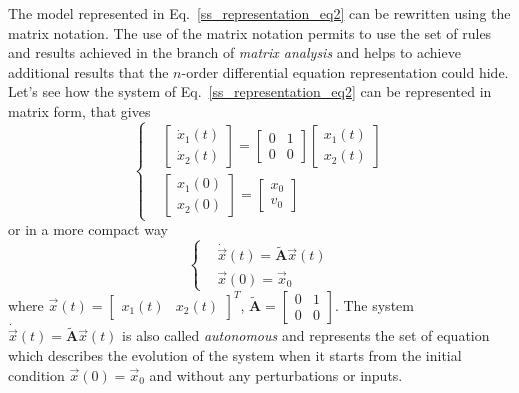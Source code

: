 \documentclass[12pt,a4paper,oneside]{book}
\begin{document}
\begin{onehalfspace}
The model represented in Eq.~\eqref{ss_representation_eq2} can be rewritten 
using the matrix notation. The use of the matrix notation permits to use the 
set of rules and results achieved in the branch of \textit{matrix analysis} 
and helps to achieve additional results that the $n$-order differential 
equation representation could hide. Let's see how the system of 
Eq.~\eqref{ss_representation_eq2} can be represented in matrix form, that gives
\begin{equation}\label{ss_representation_eq3}
	\left\lbrace \begin{aligned}
		&\begin{bmatrix} \dot{x}_1(t)\\ \dot{x}_2(t) \end{bmatrix} = \begin{bmatrix} 0&1\\0&0 \end{bmatrix} \begin{bmatrix} {x}_1(t)\\ {x}_2(t) \end{bmatrix} \\[6pt]
		&\begin{bmatrix} {x}_1(0)\\ {x}_2(0) \end{bmatrix} = \begin{bmatrix} x_0 \\ v_0 \end{bmatrix}
	\end{aligned}\right. 
\end{equation}
or in a more compact way
\begin{equation}\label{ss_representation_eq4}
	\left\lbrace \begin{aligned}
		&\dot{\vec{x}}(t)=\tilde{\mathbf{A}}\vec{x}(t) \\[6pt]
		&\vec{x}(0) = \vec{x}_0
	\end{aligned}\right. 
\end{equation}
where $\vec{x}(t)=\begin{bmatrix} x_1(t)&x_2(t) \end{bmatrix}^T$, $\tilde{\mathbf{A}}=\begin{bmatrix} 0&1\\0&0 \end{bmatrix}$.
The system $\dot{\vec{x}}(t)=\tilde{\mathbf{A}}\vec{x}(t)$ is also called 
\textit{autonomous} and represents the set of equation which describes the 
evolution of the system when it starts from the initial condition 
$\vec{x}(0)=\vec{x}_0$ and without any perturbations or inputs.


\end{onehalfspace}
\end{document}
